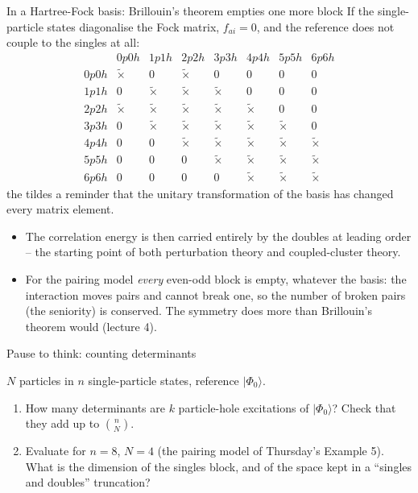 \documentclass[aspectratio=169,10pt]{beamer}
\newcounter{thinkctr}
\newcommand{\thinkq}[2]{%
  \stepcounter{thinkctr}%
  \begin{tcolorbox}[colback=palewarm,colframe=warm,title={\bfseries Pause to think \#\thethinkctr\hfill\mdseries\small(about #1 min -- discuss with your neighbour)},fonttitle=\bfseries]
  #2
  \end{tcolorbox}}
\newcommand{\ket}[1]{\vert #1\rangle}
\begin{document}
\begin{frame}{In a Hartree-Fock basis: Brillouin's theorem empties one more block}
  \small
  If the single-particle states diagonalise the Fock matrix, $f_{ai}=0$, and the reference does not couple to the singles at all:
  \[
    \begin{array}{c|ccccccc}
       & 0p0h & 1p1h & 2p2h & 3p3h & 4p4h & 5p5h & 6p6h\\
      \hline
      0p0h & \tilde{\times} & 0 & \tilde{\times} & 0 & 0 & 0 & 0\\
      1p1h & 0 & \tilde{\times} & \tilde{\times} & \tilde{\times} & 0 & 0 & 0\\
      2p2h & \tilde{\times} & \tilde{\times} & \tilde{\times} & \tilde{\times} & \tilde{\times} & 0 & 0\\
      3p3h & 0 & \tilde{\times} & \tilde{\times} & \tilde{\times} & \tilde{\times} & \tilde{\times} & 0\\
      4p4h & 0 & 0 & \tilde{\times} & \tilde{\times} & \tilde{\times} & \tilde{\times} & \tilde{\times}\\
      5p5h & 0 & 0 & 0 & \tilde{\times} & \tilde{\times} & \tilde{\times} & \tilde{\times}\\
      6p6h & 0 & 0 & 0 & 0 & \tilde{\times} & \tilde{\times} & \tilde{\times}
    \end{array}
  \]
  the tildes a reminder that the unitary transformation of the basis has changed every matrix element.
  \begin{itemize}
    \item The correlation energy is then carried entirely by the doubles at leading order -- the starting point of both perturbation theory and coupled-cluster theory.
    \item For the pairing model \emph{every} even-odd block is empty, whatever the basis: the interaction moves pairs and cannot break one, so the number of broken pairs (the seniority) is conserved. The symmetry does more than Brillouin's theorem would (lecture 4).
  \end{itemize}
\end{frame}

\begin{frame}{Pause to think: counting determinants}
  \thinkq{4}{$N$ particles in $n$ single-particle states, reference $\ket{\Phi_0}$.
  \begin{enumerate}
    \item How many determinants are $k$ particle-hole excitations of $\ket{\Phi_0}$? Check that they add up to $\binom{n}{N}$.
    \item Evaluate for $n=8$, $N=4$ (the pairing model of Thursday's Example 5). What is the dimension of the singles block, and of the space kept in a ``singles and doubles'' truncation?
  \end{enumerate}}
\end{frame}
\end{document}
